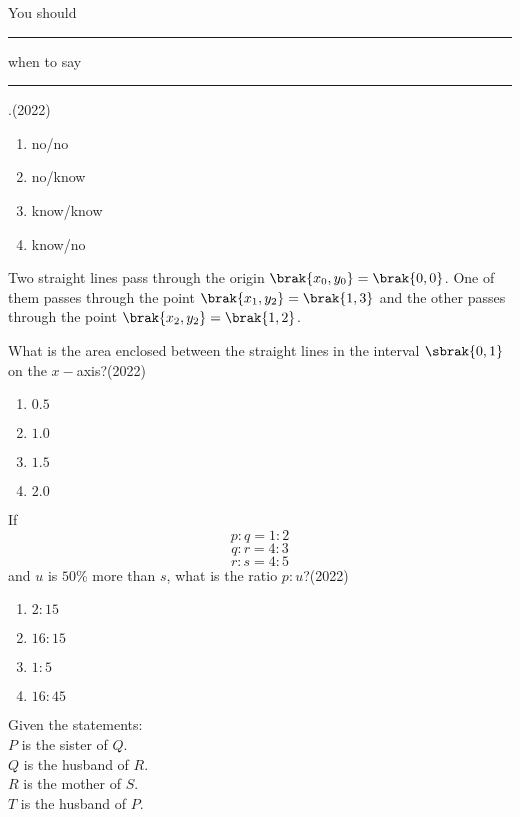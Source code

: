 \iffalse
\chapter{2022}
\author{AI24BTECH11022}
\section{ce}
\fi

\usetikzlibrary{patterns}
\item You should \rule{1cm}{0.15mm} when to say \rule{1cm}{0.15mm}.\hfill(2022)
\begin{multicols}{2}
\begin{enumerate}
\item no/no
\item no/know
\item know/know
\item know/no
\end{enumerate}
\end{multicols}


\item Two straight lines pass through the origin $\brak{x_{0},y_{0}}=\brak{0,0}$. One of them passes through the point $\brak{x_{1},y_{2}}=\brak{1,3}$ and the other passes through the point $\brak{x_{2},y_{2}}=\brak{1,2}$.

What is the area enclosed between the straight lines in the interval $\sbrak{0,1}$ on the $x-$axis?\hfill(2022)
\begin{multicols}{2}
\begin{enumerate}
\item $0.5$
\item $1.0$
\item $1.5$
\item $2.0$
\end{enumerate}
\end{multicols}


\item If $$p:q=1:2$$ $$q:r=4:3$$ $$r:s=4:5$$ and $u$ is $50\%$ more than $s$, what is the ratio $p:u$?\hfill(2022)
\begin{multicols}{2}
\begin{enumerate}
\item $2:15$
\item $16:15$
\item $1:5$
\item $16:45$
\end{enumerate}
\end{multicols}


\item Given the statements:\\
$P$ is the sister of $Q$.\\
$Q$ is the husband of $R$.\\
$R$ is the mother of $S$.\\
$T$ is the husband of $P$.\\

